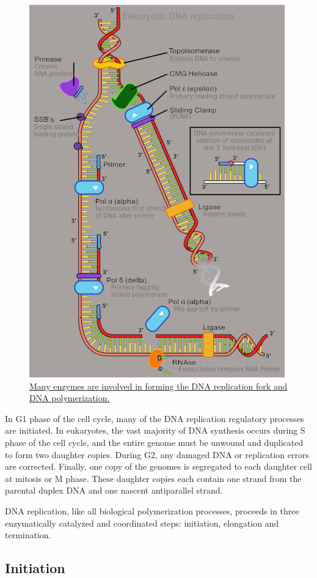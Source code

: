 \begin{figure}

{\centering \includegraphics[width=0.7\linewidth]{./figures/replication/Eukaryotic_DNA_replication} 

}

\caption{\href{https://commons.wikimedia.org/wiki/File:Eukaryotic_DNA_replication.svg}{Many enzymes are involved in forming the DNA replication fork and DNA polymerization.}}\label{fig:repforkform}
\end{figure}

In G1 phase of the cell cycle, many of the DNA replication regulatory processes are initiated. In eukaryotes, the vast majority of DNA synthesis occurs during S phase of the cell cycle, and the entire genome must be unwound and duplicated to form two daughter copies. During G2, any damaged DNA or replication errors are corrected. Finally, one copy of the genomes is segregated to each daughter cell at mitosis or M phase. These daughter copies each contain one strand from the parental duplex DNA and one nascent antiparallel strand.

DNA replication, like all biological polymerization processes, proceeds in three enzymatically catalyzed and coordinated steps: initiation, elongation and termination.

\hypertarget{initiation}{%
\subsection{Initiation}\label{initiation}}

